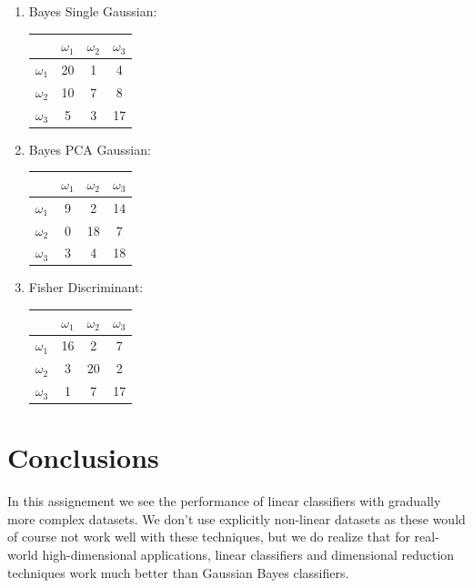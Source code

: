 \documentclass[a4paper]{article}
\begin{document}
\begin{multicols}{2}
\begin{enumerate}

\item Bayes Single Gaussian:

\begin{tabular}{ | l | c | c | c | }
\hline
& $\omega_1$ & $\omega_2$ & $\omega_3$ \\
\hline
  $\omega_1$ & 20 & 1 & 4 \\
\hline
  $\omega_2$ & 10 & 7 & 8 \\
\hline
  $\omega_3$ & 5 & 3 & 17 \\
\hline
\end{tabular}

\item Bayes PCA Gaussian:

\begin{tabular}{ | l | c | c | c | }
\hline
& $\omega_1$ & $\omega_2$ & $\omega_3$ \\
\hline
  $\omega_1$ & 9 & 2 & 14 \\
\hline
  $\omega_2$ & 0 & 18 & 7 \\
\hline
  $\omega_3$ & 3 & 4 & 18 \\
\hline
\end{tabular}
\columnbreak
\item Fisher Discriminant:

\begin{tabular}{ | l | c | c | c | }
\hline
& $\omega_1$ & $\omega_2$ & $\omega_3$ \\
\hline
  $\omega_1$ & 16 & 2 & 7 \\
\hline
  $\omega_2$ & 3 & 20 & 2 \\
\hline
  $\omega_3$ & 1 & 7 & 17 \\
\hline
\end{tabular}

\end{enumerate}
\end{multicols}


\section{Conclusions}

In this assignement we see the performance of linear classifiers with gradually more complex datasets.  We don't use explicitly non-linear datasets as these would of course not work well with these techniques, but we do realize that for real-world high-dimensional applications, linear classifiers and dimensional reduction techniques work much better than Gaussian Bayes classifiers.
\end{document}
